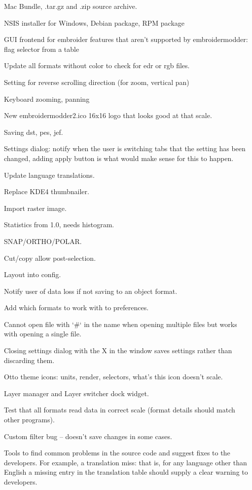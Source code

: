   \item Mac Bundle, .tar.gz and .zip source archive.
  \item NSIS installer for Windows, Debian package, RPM package
  \item GUI frontend for embroider features that aren't supported by embroidermodder: flag selector from a table
  \item Update all formats without color to check for edr or rgb files.
  \item Setting for reverse scrolling direction (for zoom, vertical pan)
  \item Keyboard zooming, panning
  \item New embroidermodder2.ico 16x16 logo that looks good at that scale.
  \item Saving dst, pes, jef.
  \item Settings dialog: notify when the user is switching tabs that the setting has been changed, adding apply button is what would make sense for this to happen.
  \item Update language translations.
  \item Replace KDE4 thumbnailer.
  \item Import raster image.
  \item Statistics from 1.0, needs histogram.
  \item SNAP/ORTHO/POLAR.
  \item Cut/copy allow post-selection.
  \item Layout into config.
  \item Notify user of data loss if not saving to an object format.
  \item Add which formats to work with to preferences.
  \item Cannot open file with `\#` in the name when opening multiple files but works with opening a single file.
  \item Closing settings dialog with the X in the window saves settings rather than discarding them.
  \item Otto theme icons: units, render, selectors, what's this icon doesn't scale.
  \item Layer manager and Layer switcher dock widget.
  \item Test that all formats read data in correct scale (format details should match other programs).
  \item Custom filter bug -- doesn't save changes in some cases.
  \item Tools to find common problems in the source code and suggest fixes to the developers. For example, a translation miss: that is, for any language other than English a missing entry in the translation table should supply a clear warning to developers.
